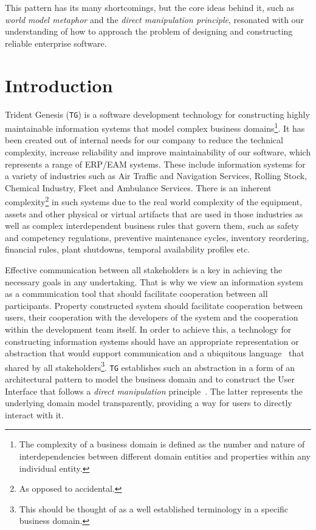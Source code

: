\documentclass[a4paper,12pt,oneside,openright,final]{memoir} %
\begin{document}
    This pattern has its many shortcomings, but the core ideas behind it, such as \emph{world model metaphor} and the \emph{direct manipulation principle}, resonated with our understanding of how to approach the problem of designing and constructing reliable enterprise software.
        
    
\section*{Introduction}
    
	Trident Genesis (\texttt{TG}) is a software development technology for constructing highly maintainable information systems that model complex business domains\footnote{The complexity of a business domain is defined as the number and nature of interdependencies between different domain entities and properties within any individual entity.}.
	It has been created out of internal needs for our company to reduce the technical complexity, increase reliability and improve maintainability of our software, which represents a range of ERP/EAM systems.
	These include information systems for a variety of industries such as Air Traffic and Navigation Services, Rolling Stock, Chemical Industry, Fleet and Ambulance Services.
	There is an inherent complexity\footnote{As opposed to accidental.} in such systems due to the real world complexity of the equipment, assets and other physical or virtual artifacts that are used in those industries as well as complex interdependent business rules that govern them, such as safety and competency regulations, preventive maintenance cycles, inventory reordering, financial rules, plant shutdowns, temporal availability profiles etc.
	
	Effective communication between all stakeholders is a key in achieving the necessary goals in any undertaking.
	That is why we view an information system as a communication tool that should facilitate cooperation between all participants. 
	Property constructed system should facilitate cooperation between users, their cooperation with the developers of the system and the cooperation within the development team itself.
	In order to achieve this, a technology for constructing information systems should have an appropriate representation or abstraction that would support communication and a ubiquitous language~\cite{evans2003} that shared by all stakeholders\footnote{This should be thought of as a well established terminology in a specific business domain.}.
	\texttt{TG} establishes such an abstraction in a form of an architectural pattern to model the business domain and to construct the User Interface that follows a \emph{direct manipulation} principle~\cite{shneiderman1982, shneiderman1983}.
	The latter represents the underlying domain model transparently, providing a way for users to directly interact with it.
\end{document}
